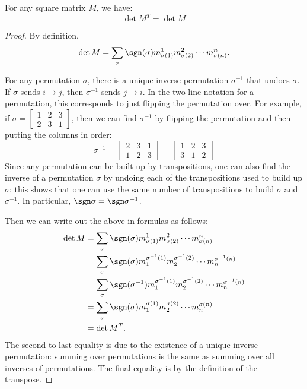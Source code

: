 \begin{theorem}
For any square matrix $M$, we have:
\[
\det M^T = \det M
\]
\end{theorem}
\begin{proof}
  By definition, \[
\det M = \sum_{\sigma} \sgn (\sigma) m^1_{\sigma(1)}m^2_{\sigma(2)}\cdots m^n_{\sigma(n)}.
\]

For any permutation $\sigma$, there is a unique inverse permutation $\sigma^{-1}$ that undoes $\sigma$.  If $\sigma$ sends $i\rightarrow j$, then $\sigma^{-1}$ sends $j\rightarrow i$.  In the two-line notation for a permutation, this corresponds to just flipping the permutation over.  For example, if $\sigma=\begin{bmatrix} 
1 & 2 & 3 \\
2 & 3 & 1
\end{bmatrix}$, then we can find $\sigma^{-1}$ by flipping the permutation and then putting the columns in order:
\[
\sigma^{-1}=\begin{bmatrix} 
2 & 3 & 1 \\
1 & 2 & 3
\end{bmatrix}=\begin{bmatrix} 
1 & 2 & 3 \\
3 & 1 & 2
\end{bmatrix}
\]
Since any permutation can be built up by transpositions, one can also find the inverse of a permutation $\sigma$ by undoing each of the transpositions used to build up $\sigma$; this shows that one can use the same number of transpositions to build $\sigma$ and $\sigma^{-1}$.  In particular, $\sgn \sigma= \sgn \sigma^{-1}$.


Then we can write out the above in formulas as follows:
\begin{align*}
\det M &= \sum_{\sigma} \sgn (\sigma) m^1_{\sigma(1)}m^2_{\sigma(2)}\cdots m^n_{\sigma(n)} \\
&=\sum_{\sigma} \sgn (\sigma) m_1^{\sigma^{-1}(1)}m_2^{\sigma^{-1}(2)}\cdots m_n^{\sigma^{-1}(n)} \\
&=\sum_{\sigma} \sgn (\sigma^{-1}) m_1^{\sigma^{-1}(1)}m_2^{\sigma^{-1}(2)}\cdots m_n^{\sigma^{-1}(n)} \\
&= \sum_{\sigma} \sgn (\sigma) m_1^{\sigma(1)}m_2^{\sigma(2)}\cdots m_n^{\sigma(n)} \\
&= \det M^T.
\end{align*}
The second-to-last equality is due to the existence of a unique inverse permutation: summing over permutations is the same as summing over all inverses of permutations.  The final equality is by the definition of the transpose.
\end{proof}

